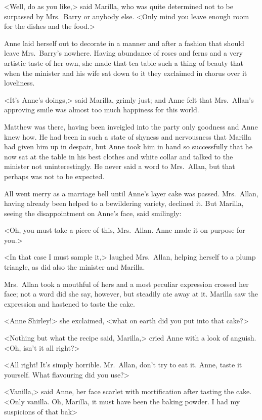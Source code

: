<Well, do as you like,> said Marilla, who was quite determined not to be surpassed by Mrs.~Barry or anybody else. <Only mind you leave enough room for the dishes and the food.>

Anne laid herself out to decorate in a manner and after a fashion that should leave Mrs.~Barry's nowhere. Having abundance of roses and ferns and a very artistic taste of her own, she made that tea table such a thing of beauty that when the minister and his wife sat down to it they exclaimed in chorus over it loveliness.

<It's Anne's doings,> said Marilla, grimly just; and Anne felt that Mrs.~Allan's approving smile was almost too much happiness for this world.

Matthew was there, having been inveigled into the party only goodness and Anne knew how. He had been in such a state of shyness and nervousness that Marilla had given him up in despair, but Anne took him in hand so successfully that he now sat at the table in his best clothes and white collar and talked to the minister not uninterestingly. He never said a word to Mrs.~Allan, but that perhaps was not to be expected.

All went merry as a marriage bell until Anne's layer cake was passed. Mrs.~Allan, having already been helped to a bewildering variety, declined it. But Marilla, seeing the disappointment on Anne's face, said smilingly:

<Oh, you must take a piece of this, Mrs.~Allan. Anne made it on purpose for you.>

<In that case I must sample it,> laughed Mrs.~Allan, helping herself to a plump triangle, as did also the minister and Marilla.

Mrs.~Allan took a mouthful of hers and a most peculiar expression crossed her face; not a word did she say, however, but steadily ate away at it. Marilla saw the expression and hastened to taste the cake.

<Anne Shirley!> she exclaimed, <what on earth did you put into that cake?>

<Nothing but what the recipe said, Marilla,> cried Anne with a look of anguish. <Oh, isn't it all right?>

<All right! It's simply horrible. Mr.~Allan, don't try to eat it. Anne, taste it yourself. What flavouring did you use?>

<Vanilla,> said Anne, her face scarlet with mortification after tasting the cake. <Only vanilla. Oh, Marilla, it must have been the baking powder. I had my suspicions of that bak\longdash>

